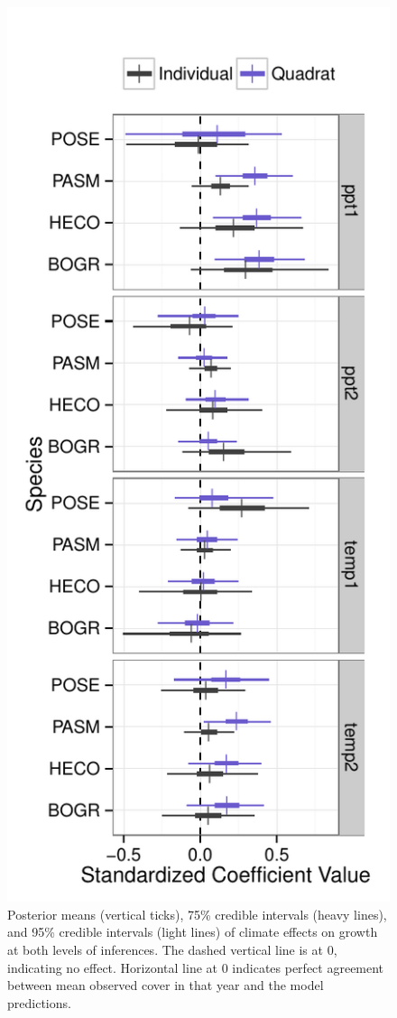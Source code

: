 \documentclass[author-year, 12pt,review]{components/elsarticle} %
\makeatletter
\def\maxwidth{\ifdim\Gin@nat@width>\linewidth\linewidth
\else\Gin@nat@width\fi}
\let\Oldincludegraphics\includegraphics
\renewcommand{\includegraphics}[1]{\Oldincludegraphics[width=\maxwidth]{#1}}
\makeatother
\begin{document}
\begin{figure}[htbp]
\centering
\includegraphics{components/figure/manuscript-figure_2.pdf}
\caption{Posterior means (vertical ticks), 75\% credible intervals
(heavy lines), and 95\% credible intervals (light lines) of climate
effects on growth at both levels of inferences. The dashed vertical line
is at 0, indicating no effect. Horizontal line at 0 indicates perfect
agreement between mean observed cover in that year and the model
predictions.}
\end{figure}
\end{document}
